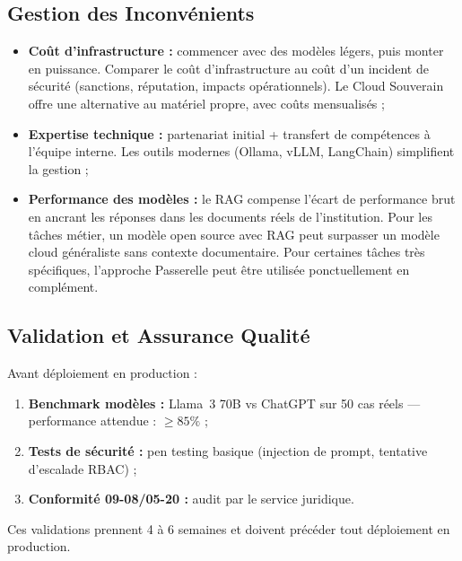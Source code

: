 \documentclass[12pt, a4paper]{report}
\begin{document}
\subsection{Gestion des Inconvénients}

\begin{itemize}
  \item \textbf{Coût d'infrastructure :} commencer avec des modèles
        légers, puis monter en puissance. Comparer le coût
        d'infrastructure au coût d'un incident de sécurité (sanctions,
        réputation, impacts opérationnels). Le Cloud Souverain offre une
        alternative au matériel propre, avec coûts mensualisés ;
  \item \textbf{Expertise technique :} partenariat initial + transfert
        de compétences à l'équipe interne. Les outils modernes (Ollama,
        vLLM, LangChain) simplifient la gestion ;
  \item \textbf{Performance des modèles :} le RAG compense l'écart de
        performance brut en ancrant les réponses dans les documents réels
        de l'institution. Pour les tâches métier, un modèle open source
        avec RAG peut surpasser un modèle cloud généraliste sans contexte
        documentaire. Pour certaines tâches très spécifiques, l'approche
        Passerelle peut être utilisée ponctuellement en complément.
\end{itemize}

\subsection{Validation et Assurance Qualité}

Avant déploiement en production :

\begin{enumerate}
  \item \textbf{Benchmark modèles :} Llama~3 70B vs ChatGPT sur 50 cas
        réels --- performance attendue : \(\geq 85\%\) ;
  \item \textbf{Tests de sécurité :} pen testing basique (injection de
        prompt, tentative d'escalade RBAC) ;
  \item \textbf{Conformité 09-08/05-20 :} audit par le service juridique.
\end{enumerate}

Ces validations prennent 4 à 6 semaines et doivent précéder tout
déploiement en production.

\vspace{0.8cm}
\end{document}
